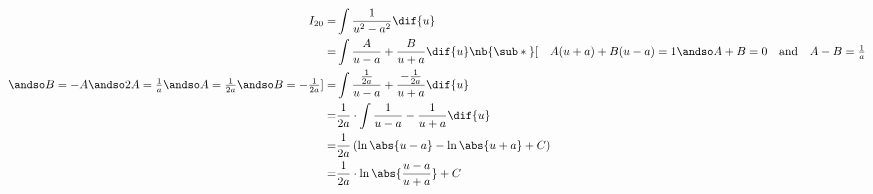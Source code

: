 \def\no{20}
\def\theintegral{\(\int{\frac{ 1 }{ u^2-a^2 } }\dif{u}%
=\frac{1}{2a} { \ln\abs{ \frac{u-a}{ u+a } } }+C\)}

\begin{align*}
{I}_{\no}
=&  \int{ \frac{ 1 }{ u^2-a^2 } }\dif{u} \\
=&  \int{ \frac{ A }{ u-a } + \frac{ B }{ u+a } }\dif{u}
\nb{\sub*{}}[\quad
  A(u+a)+B(u-a) = 1
  \andso A+B=0 \quad\text{and}\quad A-B=\tfrac{1}{a} \\
  \andso B=-A
  \andso 2A=\tfrac{1}{a}
  \andso A=\tfrac{1}{2a}
  \andso B=-\tfrac{1}{2a}
]
=&  \int{ \frac{ \frac{1}{2a} }{ u-a }
        + \frac{ -\frac{1}{2a} }{ u+a } }\dif{u} \\
=&  \frac{1}{2a} \cdot \int{
       \frac{ 1 }{ u-a } - \frac{ 1 }{ u+a } }\dif{u} \\
=&  \frac{1}{2a} \left(
      \ln\abs{ u-a } - \ln\abs{ u+a } + C
    \right) \\
=&  \frac{1}{2a} \cdot { \ln\abs{ \frac{u-a}{ u+a } } }+C
\end{align*}

